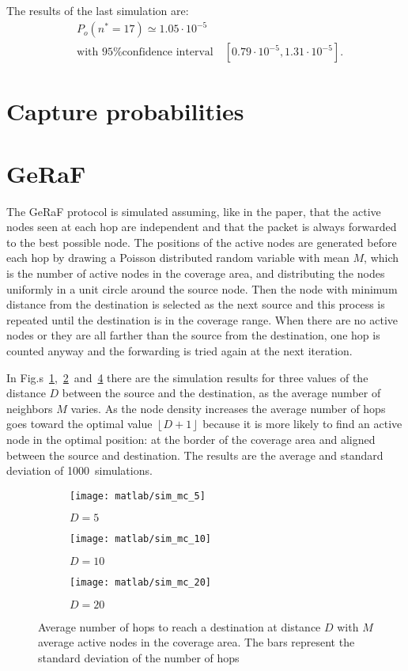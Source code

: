 \documentclass[a4paper,oneside]{article}
\renewcommand{\approx}[0]{\simeq}
\newcommand{\floor}[1]{\left\lfloor#1\right\rfloor}
\begin{document}
The results of the last simulation are:
\begin{align*}
  & P_o(n^* = 17) \approx 1.05 \cdot 10^{-5} \\
  & \text{with 95\% confidence interval} \quad [0.79 \cdot 10^{-5}, 1.31 \cdot 10^{-5}] .
\end{align*}
\section{Capture probabilities}
\section{GeRaF}
The GeRaF protocol is simulated assuming, like in the paper, that the
active nodes seen at each hop are independent and that the packet is
always forwarded to the best possible node.
%
The positions of the active nodes are generated before each hop by
drawing a Poisson distributed random variable with mean $M$, which is
the number of active nodes in the coverage area, and distributing the
nodes uniformly in a unit circle around the source node.
%
Then the node with minimum distance from the destination is selected
as the next source and this process is repeated until the destination
is in the coverage range.
%
When there are no active nodes or they are all farther than the source
from the destination, one hop is counted anyway and the forwarding is
tried again at the next iteration.

In
Fig.s~\ref{plot:geraf_sim_5},~\ref{plot:geraf_sim_10}~and~\ref{plot:geraf_sim_20}
there are the simulation results for three values of the distance $D$
between the source and the destination, as the average number of
neighbors $M$ varies. As the node density increases the average number
of hops goes toward the optimal value $\floor{D+1}$ because it is more
likely to find an active node in the optimal position: at the border
of the coverage area and aligned between the source and destination.
%
The results are the average and standard deviation of
1000~simulations.
\begin{figure}[htbp]
  \centering
  \begin{subfigure}{0.5\textwidth}
    \centering
    \texttt{[image: matlab/sim\_mc\_5]}
    \caption{$ D = 5 $}
    \label{plot:geraf_sim_5}
  \end{subfigure}%
  \begin{subfigure}{0.5\textwidth}
    \centering
    \texttt{[image: matlab/sim\_mc\_10]}
    \caption{$ D = 10 $}
    \label{plot:geraf_sim_10}
  \end{subfigure}
  \begin{subfigure}{0.5\textwidth}
    \centering
    \texttt{[image: matlab/sim\_mc\_20]}
    \caption{$ D = 20 $}
    \label{plot:geraf_sim_20}
  \end{subfigure}
  \caption{Average number of hops to reach a destination at distance
    $D$ with $M$ average active nodes in the coverage area. The bars
    represent the standard deviation of the number of hops}
\end{figure}
\end{document}
